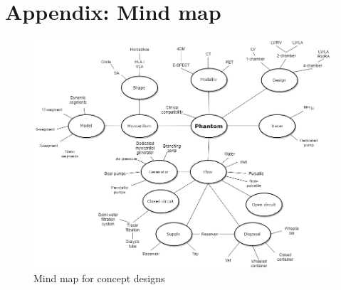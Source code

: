 
\chapter{Appendix: Mind map }


\begin{figure} [H]
\includegraphics[width=\textwidth,height=\textheight,keepaspectratio]{./images/concept_diagram.png}
\caption{Mind map for concept designs}
\label{fig:mind_map}
\end{figure}

